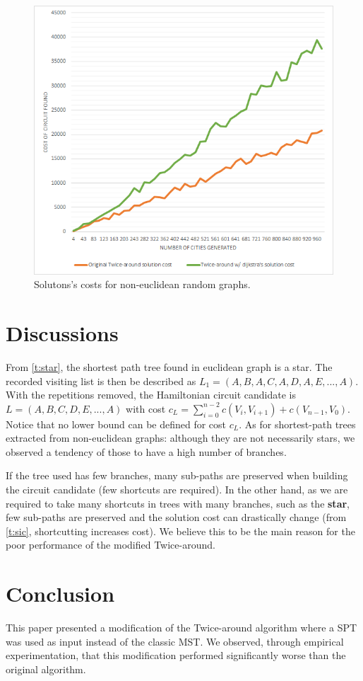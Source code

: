 \documentclass[journal]{IEEEtran}
\begin{document}
\begin{figure}[H]
	\centering
	\includegraphics[width=.95\linewidth]{comparison-ta-random-graphs}
	\caption{Solutons's costs for non-euclidean random graphs.}
	\label{fig:ctrg}
\end{figure}

\section{Discussions}

From \ref{t:star}, the shortest path tree found in euclidean graph is a star. The recorded visiting list is then be described as $L_1=(A, B, A, C, A, D, A, E, ..., A)$. With the repetitions removed, the Hamiltonian circuit candidate is $L=(A,B,C, D, E, ..., A)$ with cost $c_L=\sum_{i=0}^{n-2} c(V_i, V_{i+1}) + c(V_{n-1}, V_0)$. Notice that no lower bound can be defined for cost $c_L$. As for shortest-path trees extracted from non-euclidean graphs: although they are not necessarily stars, we observed a tendency of those to have a high number of branches.

If the tree used has few branches, many sub-paths are preserved when building the circuit candidate (few shortcuts are required). In the other hand, as we are required to take many shortcuts in trees with many branches, such as the \textbf{star}, few sub-paths are preserved and the solution cost can drastically change (from \ref{t:sic}, shortcutting increases cost). We believe this to be the main reason for the poor performance of the modified Twice-around.

\section{Conclusion}

This paper presented a modification of the Twice-around algorithm where a SPT was used as input instead of the classic MST. We observed, through empirical experimentation, that this modification performed significantly worse than the original algorithm.



\end{document}
